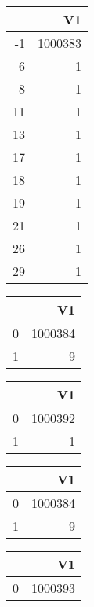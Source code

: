 \bigskip\bigskip
\centering
\begin{tabular}{rr}
  \hline
 & V1 \\ 
  \hline
-1 & 1000383 \\ 
  6 &   1 \\ 
  8 &   1 \\ 
  11 &   1 \\ 
  13 &   1 \\ 
  17 &   1 \\ 
  18 &   1 \\ 
  19 &   1 \\ 
  21 &   1 \\ 
  26 &   1 \\ 
  29 &   1 \\ 
   \hline
\end{tabular}

\bigskip\bigskip
\centering
\begin{tabular}{rr}
  \hline
 & V1 \\ 
  \hline
0 & 1000384 \\ 
  1 &   9 \\ 
   \hline
\end{tabular}

\bigskip\bigskip
\centering
\begin{tabular}{rr}
  \hline
 & V1 \\ 
  \hline
0 & 1000392 \\ 
  1 &   1 \\ 
   \hline
\end{tabular}

\bigskip\bigskip
\centering
\begin{tabular}{rr}
  \hline
 & V1 \\ 
  \hline
0 & 1000384 \\ 
  1 &   9 \\ 
   \hline
\end{tabular}

\bigskip\bigskip
\centering
\begin{tabular}{rr}
  \hline
 & V1 \\ 
  \hline
0 & 1000393 \\ 
   \hline
\end{tabular}

